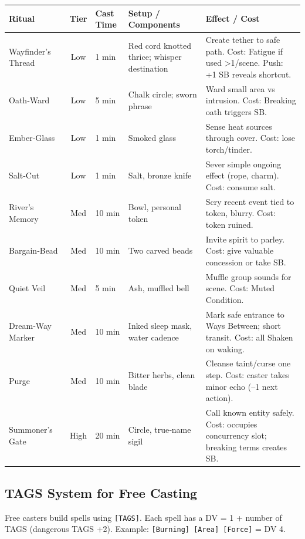 \begin{center}
\small
\begin{tabularx}{\textwidth}{l c l l X}
\toprule
\textbf{Ritual} & \textbf{Tier} & \textbf{Cast Time} & \textbf{Setup / Components} & \textbf{Effect / Cost} \\
\midrule
Wayfinder's Thread & Low & 1 min & Red cord knotted thrice; whisper destination & Create tether to safe path. Cost: Fatigue if used >1/scene. Push: +1 SB reveals shortcut. \\
Oath‑Ward & Low & 5 min & Chalk circle; sworn phrase & Ward small area vs intrusion. Cost: Breaking oath triggers SB. \\
Ember‑Glass & Low & 1 min & Smoked glass & Sense heat sources through cover. Cost: lose torch/tinder. \\
Salt‑Cut & Low & 1 min & Salt, bronze knife & Sever simple ongoing effect (rope, charm). Cost: consume salt. \\
River's Memory & Med & 10 min & Bowl, personal token & Scry recent event tied to token, blurry. Cost: token ruined. \\
Bargain‑Bead & Med & 10 min & Two carved beads & Invite spirit to parley. Cost: give valuable concession or take SB. \\
Quiet Veil & Med & 5 min & Ash, muffled bell & Muffle group sounds for scene. Cost: Muted Condition. \\
Dream‑Way Marker & Med & 10 min & Inked sleep mask, water cadence & Mark safe entrance to Ways Between; short transit. Cost: all Shaken on waking. \\
Purge & Med & 10 min & Bitter herbs, clean blade & Cleanse taint/curse one step. Cost: caster takes minor echo (--1 next action). \\
Summoner's Gate & High & 20 min & Circle, true‑name sigil & Call known entity safely. Cost: occupies concurrency slot; breaking terms creates SB. \\
\bottomrule
\end{tabularx}
\end{center}

\subsection{TAGS System for Free Casting}

Free casters build spells using \texttt{[TAGS]}. Each spell has a DV = 1 + number of TAGS (dangerous TAGS +2). Example: \texttt{[Burning] [Area] [Force]} = DV 4.

